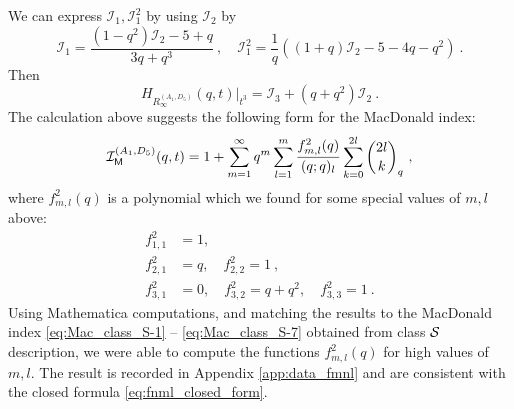 \documentclass[a4paper,10pt]{article}
\newcommand{\mr}[1]{\mathsf{#1}}
\def\CI {{\cal I}}
\def\CI {{{\cal I}}}
\def\CS {{\cal S}}
\begin{document}
We can express $\mathcal{I}_1, \mathcal{I}_1^2$ by using $\mathcal{I}_2$ by
\begin{equation}
\mathcal{I}_1 = \frac{(1-q^2) \mathcal{I}_2 - 5+ q}{3 q + q^3}~, \quad 
\mathcal{I}_1^2 = \frac{1}{q}\left((1+q)\mathcal{I}_2 -5 - 4q - q^2\right)~. 
\end{equation}
Then
\begin{equation}
H_{R^{(A_1, D_5)}_{\infty}}(q, t)|_{t^3} = \mathcal{I}_3 + (q + q^2)\mathcal{I}_2~.
\end{equation}
The calculation above suggests the following form for the MacDonald index:
\begin{equation}\label{eq:Mac_A1D5_conj}
    \CI_{\mr{M}}^{(A_1,D_5)}(q,t)=1+\sum_{m=1}^\infty 
    q^m \sum_{l=1}^m
    \frac{f^2_{m,l}(q)}{(q;q)_l}\sum_{k=0}^{2l}\binom{2l}{k}_q~,
\end{equation}
where $f^2_{m,l}(q)$ is a polynomial which we found for some special values of $m,l$ above:
\begin{equation}
\begin{split}
    f^2_{1,1}&=1,
    \\
    f^2_{2,1}&=q, \quad f^2_{2,2}=1~,
    \\
    f^2_{3,1}&=0, \quad f^2_{3,2}=q+q^2, \quad f^2_{3,3}=1~. 
\end{split}    
\end{equation}
Using Mathematica computations, and matching the results to the MacDonald index \eqref{eq:Mac_class_S-1} -- \eqref{eq:Mac_class_S-7} obtained from class $\CS$ description, we were able to compute the functions $f^2_{m,l}(q)$ for high values of $m,l$. The result is recorded in Appendix \ref{app:data_fmnl} and are consistent with the closed formula \eqref{eq:fnml_closed_form}.
\par
\end{document}
